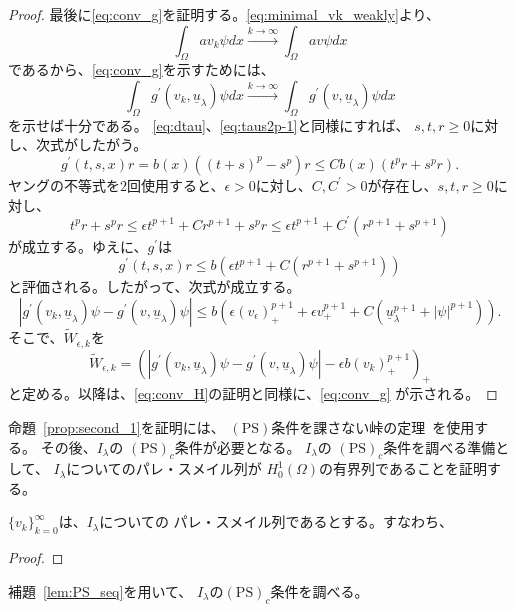 \begin{proof}
 最後に\eqref{eq:conv_g}を証明する。\eqref{eq:minimal_vk_weakly}より、
 \[
  \int_\Omega a v_k \psi dx \xrightarrow{k \to \infty} \int_\Omega
 av\psi dx
 \]
 であるから、\eqref{eq:conv_g}を示すためには、
 \[
  \int_\Omega g^\prime(v_k, \underline{u}_\lambda)\psi dx \xrightarrow{
  k \to \infty } 
  \int_\Omega g^\prime(v, \underline{u}_\lambda)\psi dx
 \]
 を示せば十分である。
 \eqref{eq:dtau}、\eqref{eq:taus2p-1}と同様にすれば、
 $s, t, r \geq 0$に対し、次式がしたがう。
 \[
  g^\prime(t, s, x)r = b(x) \left( (t+s)^p - s^p \right) r \leq C b(x)
 \left( t^pr + s^p r \right).
 \]
 ヤングの不等式を$2$回使用すると、$\epsilon > 0$に対し、$C, C^\prime >
 0$が存在し、$s, t, r \geq 0$に対し、
 \[
  t^p r + s^p r \leq \epsilon t^{p+1} + C r^{p+1} + s^p r \leq
 \epsilon t^{p+1} + C^\prime (r^{p+1} + s^{p+1})
 \]
 が成立する。ゆえに、$g^\prime$は
 \[
  g^\prime(t, s, x)r \leq b \left( \epsilon t^{p+1} + C ( r^{p+1} +
 s^{p+1}) \right)
 \]
 と評価される。したがって、次式が成立する。
 \[  
  \left\lvert g^\prime(v_k, \underline{u}_\lambda)\psi - g^\prime(v,
   \underline{u}_\lambda)\psi \right\rvert \leq b \left( \epsilon
   (v_\epsilon)_+^{p+1}  + \epsilon v_+^{p+1} + C
   (\underline{u}_\lambda^{p+1} + \lvert \psi \rvert^{p+1})
                                 \right).
 \]
 そこで、$\tilde{W}_{\epsilon, k}$を
\[  \tilde{W}_{\epsilon, k} = 
   \left( \left\lvert g^\prime(v_k, \underline{u}_\lambda)\psi - g^\prime(v,
    \underline{u}_\lambda)\psi \right\rvert
  -\epsilon b (v_k)_+^{p+1}
          \right)_+ \]
 と定める。以降は、\eqref{eq:conv_H}の証明と同様に、\eqref{eq:conv_g}
 が示される。\qedhere
\end{proof}

命題~\ref{prop:second_1}を証明には、
$(\mathrm{PS})$条件を課さない峠の定理~\cite{MR0370183}を使用する。
その後、$I_\lambda$の
$(\mathrm{PS})_c$条件が必要となる。
$I_\lambda$の
$(\mathrm{PS})_c$条件を調べる準備として、
$I_\lambda$についてのパレ・スメイル列が
$H_0^1(\Omega)$の有界列であることを証明する。

\begin{lem} \label{lem:PS_seq}
 $\{ v_k \}_{k=0}^\infty$は、$I_\lambda$についての
 パレ・スメイル列であるとする。すなわち、
\end{lem}

\begin{proof}
 
\end{proof}

補題~\ref{lem:PS_seq}を用いて、
$I_\lambda$の$(\mathrm{PS})_c$条件を調べる。

